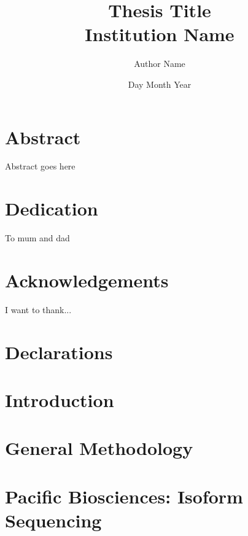 \documentclass[a4paper,12pt,oneside]{report}
\begin{document}
\title{
	{Thesis Title}\\
	{\large Institution Name}\\}
\author{Author Name}
\date{Day Month Year}

\normallinespacing
\maketitle

\chapter*{Abstract}
Abstract goes here

\chapter*{Dedication}
To mum and dad

\chapter*{Acknowledgements}
I want to thank...

\chapter*{Declarations}



\newpage
\tableofcontents

\newpage
\listoffigures

\newpage
\listoftables

\newpage
\renewcommand{\nomname}{Abbreviations}
\printnomenclature 

\chapter{Introduction}


\chapter{General Methodology}


\chapter{Pacific Biosciences: Isoform Sequencing}




\end{document}
